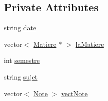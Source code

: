 \subsection*{Private Attributes}
\begin{DoxyCompactItemize}
\item 
string \hyperlink{classEvaluation_a988e6c0d8b2a9807e4271ed921cd529b}{date}
\item 
vector$<$ \hyperlink{classMatiere}{Matiere} $\ast$ $>$ \hyperlink{classEvaluation_a17d4cb8a38684cf2682bb177c07d70bc}{la\+Matiere}
\item 
int \hyperlink{classEvaluation_a6e249e787cadf640c9d8e9853434ec77}{semestre}
\item 
string \hyperlink{classEvaluation_a6c6d0d48e47374eac25e10c37b5e29f9}{sujet}
\item 
vector$<$ \hyperlink{classNote}{Note} $>$ \hyperlink{classEvaluation_a79208e29aac3dc8c7b1f192498cc3a3a}{vect\+Note}
\end{DoxyCompactItemize}


